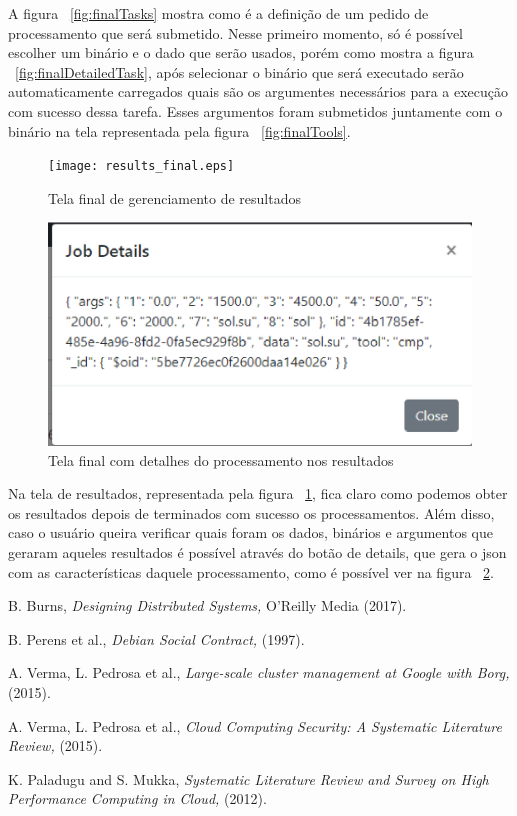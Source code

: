 \documentclass[11pt,twoside]{article}
\begin{document}
A figura ~\ref{fig:finalTasks} mostra como é a definição de um pedido de processamento que será submetido. Nesse primeiro momento, só é possível escolher um binário e o dado que serão usados, porém como mostra 
a figura ~\ref{fig:finalDetailedTask}, após selecionar o binário que será executado serão automaticamente carregados quais são os argumentes necessários para a execução com sucesso dessa tarefa. Esses argumentos
foram submetidos juntamente com o binário na tela representada pela figura ~\ref{fig:finalTools}.

\begin{figure}[!h]
  \centering
  \texttt{[image: results\_final.eps]}
  \caption{Tela final de gerenciamento de resultados}
  \label{fig:finalResults}
\end{figure}

\begin{figure}[!h]
  \centering
  \includegraphics[scale=0.6]{results_detail_final.eps}
  \caption{Tela final com detalhes do processamento nos resultados}
  \label{fig:finalResultsDetail}
\end{figure}

Na tela de resultados, representada pela figura ~\ref{fig:finalResults}, fica claro como podemos obter os resultados depois de terminados com sucesso os processamentos. Além disso, caso o usuário queira verificar 
quais foram os dados, binários e argumentos que geraram aqueles resultados é possível através do botão de details, que gera o json com as características daquele processamento, como é possível ver na 
figura ~\ref{fig:finalResultsDetail}.


\begin{thebibliography}{99}

 B. Burns, {\it Designing Distributed Systems,} O'Reilly Media (2017).

 B. Perens et al., {\it Debian Social Contract,} (1997).

 A. Verma, L. Pedrosa  et al., {\it Large-scale cluster management at Google with Borg,} (2015).

 A. Verma, L. Pedrosa  et al., {\it Cloud Computing Security: A Systematic Literature Review,} (2015).

 K. Paladugu and S. Mukka, {\it Systematic Literature Review and Survey on High Performance Computing in Cloud,} (2012).

\end{thebibliography}
\end{document}

